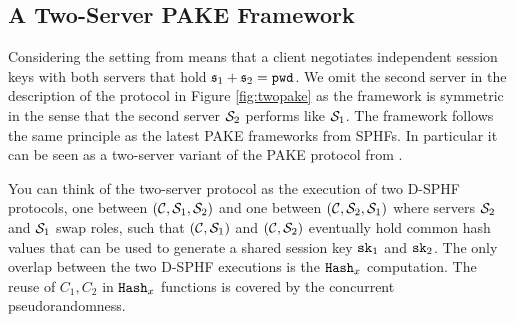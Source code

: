 
\subsection{A Two-Server PAKE Framework}
Considering the setting from \citet{Katz2012a} means that a client negotiates independent session keys with both servers that hold $\mathfrak{s}_1+\mathfrak{s}_2=\mathtt{pwd}$.
We omit the second server in the description of the protocol in Figure \ref{fig:twopake} as the framework is symmetric in the sense that the second server $\mathcal{S}_2$ performs like $\mathcal{S}_1$.
The framework follows the same principle as the latest \ac{PAKE} frameworks from \acp{SPHF}.
In particular it can be seen as a two-server variant of the \ac{PAKE} protocol from \citet{Katz2011}.

You can think of the two-server protocol as the execution of two \ac{D-SPHF} protocols, one between $(\mathcal{C},\mathcal{S}_1,\mathcal{S}_2)$ and one between $(\mathcal{C},\mathcal{S}_2,\mathcal{S}_1)$ where servers $\mathcal{S}_2$ and $\mathcal{S}_1$ swap roles, such that $(\mathcal{C},\mathcal{S}_1)$ and $(\mathcal{C},\mathcal{S}_2)$ eventually hold common hash values that can be used to generate a shared session key $\mathtt{sk}_1$ and $\mathtt{sk}_2$.
The only overlap between the two \ac{D-SPHF} executions is the $\mathtt{Hash}_x$ computation.
The reuse of $C_1,C_2$ in $\mathtt{Hash}_x$ functions is covered by the concurrent pseudorandomness.

